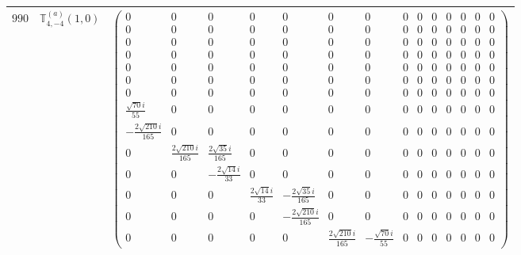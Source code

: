 \documentclass[fleqn,8pt,landscape]{jsarticle}
\begin{document}
\begin{center}
\begin{longtable}{ccc}
$ 990 $ & $ \mathbb{T}_{4,-4}^{(a)}(1,0) $ & $ \begin{pmatrix} 0 & 0 & 0 & 0 & 0 & 0 & 0 & 0 & 0 & 0 & 0 & 0 & 0 & 0 \\ 0 & 0 & 0 & 0 & 0 & 0 & 0 & 0 & 0 & 0 & 0 & 0 & 0 & 0 \\ 0 & 0 & 0 & 0 & 0 & 0 & 0 & 0 & 0 & 0 & 0 & 0 & 0 & 0 \\ 0 & 0 & 0 & 0 & 0 & 0 & 0 & 0 & 0 & 0 & 0 & 0 & 0 & 0 \\ 0 & 0 & 0 & 0 & 0 & 0 & 0 & 0 & 0 & 0 & 0 & 0 & 0 & 0 \\ 0 & 0 & 0 & 0 & 0 & 0 & 0 & 0 & 0 & 0 & 0 & 0 & 0 & 0 \\ 0 & 0 & 0 & 0 & 0 & 0 & 0 & 0 & 0 & 0 & 0 & 0 & 0 & 0 \\ \frac{\sqrt{70} i}{55} & 0 & 0 & 0 & 0 & 0 & 0 & 0 & 0 & 0 & 0 & 0 & 0 & 0 \\ - \frac{2 \sqrt{210} i}{165} & 0 & 0 & 0 & 0 & 0 & 0 & 0 & 0 & 0 & 0 & 0 & 0 & 0 \\ 0 & \frac{2 \sqrt{210} i}{165} & \frac{2 \sqrt{35} i}{165} & 0 & 0 & 0 & 0 & 0 & 0 & 0 & 0 & 0 & 0 & 0 \\ 0 & 0 & - \frac{2 \sqrt{14} i}{33} & 0 & 0 & 0 & 0 & 0 & 0 & 0 & 0 & 0 & 0 & 0 \\ 0 & 0 & 0 & \frac{2 \sqrt{14} i}{33} & - \frac{2 \sqrt{35} i}{165} & 0 & 0 & 0 & 0 & 0 & 0 & 0 & 0 & 0 \\ 0 & 0 & 0 & 0 & - \frac{2 \sqrt{210} i}{165} & 0 & 0 & 0 & 0 & 0 & 0 & 0 & 0 & 0 \\ 0 & 0 & 0 & 0 & 0 & \frac{2 \sqrt{210} i}{165} & - \frac{\sqrt{70} i}{55} & 0 & 0 & 0 & 0 & 0 & 0 & 0 \end{pmatrix} $ \\ \hline

\end{longtable}
\end{center}
\end{document}

